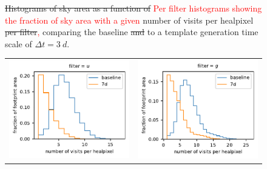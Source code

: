 \documentclass[preprintm,linenumbers]{aastex631}
\providecommand{\red}[1]{\textcolor{red}{#1}}
\begin{document}
\begin{figure}
\begin{tabular}{@{}c@{}c@{}}
			\end{tabular}
			\caption{
				\sout{Histograms of sky area as a function of} 
                \red{Per filter histograms showing the fraction of sky area with a given} number of visits per healpixel\sout{ per filter}\red{,} comparing the baseline \sout{and} to a template generation time scale of $\Delta t = 3\ \si{d}$. \label{appendixb:1}}
		\end{figure}


    \begin{figure}
			\centering
			\begin{tabular}{@{}c@{}c@{}}
				\includegraphics{results/histograms/hist_first_year_one_snap_v4_0_10yrs_db_noDD_noTwi_CountMetric_doAllTemplateMetrics_reduceCount_u_7_noDD_noTwi.pdf} &
				 \includegraphics{results/histograms/hist_first_year_one_snap_v4_0_10yrs_db_noDD_noTwi_CountMetric_doAllTemplateMetrics_reduceCount_g_7_noDD_noTwi.pdf} \\

\end{tabular}
\end{figure}
\end{document}
